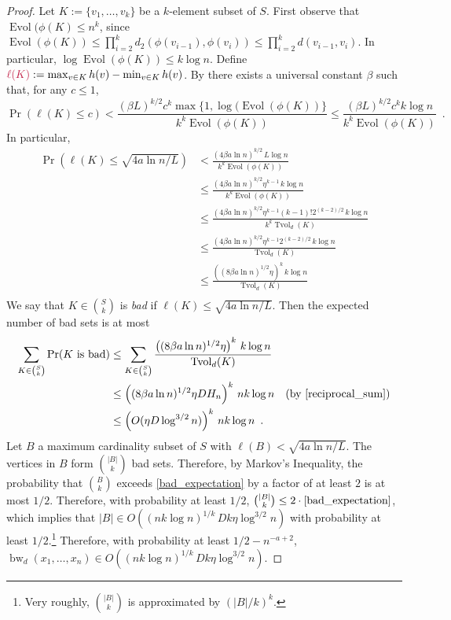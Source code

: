 \documentclass{patmorin}
\makeatletter
\newcommand{\defin}[1]{\emph{\textcolor{brightmaroon}{#1}}}
\def\mathcolor#1#{\@mathcolor{#1}}
\def\@mathcolor#1#2#3{%
  \protect\leavevmode
  \begingroup
    \color#1{#2}#3%
  \endgroup
}
\newcommand{\mathdefin}[1]{\mathcolor{brightmaroon}{#1}}
\DeclareMathOperator{\bw}{bw}
\DeclareMathOperator{\evol}{Evol}
\DeclareMathOperator{\tvol}{Tvol}
\makeatother
\begin{document}
\begin{proof}
  Let  $K:=\{v_1,\ldots,v_k\}$ be a $k$-element subset of $S$. First observe that $\evol(\phi(K)\le n^k$, since $\evol(\phi(K))\le\prod_{i=2}^k d_2(\phi(v_{i-1}),\phi(v_i))\le \prod_{i=2}^k d(v_{i-1},v_i)$.  In particular, $\log\evol(\phi(K))\le k\log n$.  Define $\mathdefin{\ell(K)}:=\max_{v\in K}h(v)-\min_{v\in K} h(v)$.  By \cite[Theorem~9]{feige:approximating} there exists a universal constant $\beta$ such that, for any $c\le 1$,
  \[
      \Pr(\ell(K) \le c)
        < \frac{(\beta L)^{k/2}c^k\max\{1,\log(\evol(\phi(K))\}}{k^k\evol(\phi(K))}
        \le \frac{(\beta L)^{k/2}c^kk\log n}{k^k\evol(\phi(K))} \enspace .
  \]
  In particular,
  \begin{align*}
    \Pr(\ell(K) \le \sqrt{4a\ln n/L})
      & <
      \frac{(4\beta a\ln n)^{k/2}\, L\log n}{k^k\evol(\phi(K))} \\
      & \le \frac{(4\beta a\ln n)^{k/2}\eta^{k-1}\, k\log n}{k^k\evol(\phi(K))} \\
      & \le \frac{(4\beta a\ln n)^{k/2}\eta^{k-1}(k-1)!2^{(k-2)/2}\, k\log n}{k^k\tvol_{d}(K)} \\
      & \le \frac{(4\beta a\ln n)^{k/2}\eta^{k-1}2^{(k-2)/2}\,k\log n}{\tvol_{d}(K)} \\
      & \le \frac{\left((8\beta a\ln n)^{1/2}\eta\right)^{k}\,k\log n}{\tvol_{d}(K)} \\
  \end{align*}
  We say that $K\in\binom{S}{k}$ is \defin{bad} if $\ell(K) \le \sqrt{4a\ln n/L}$. Then the expected number of bad sets is at most
  \begin{align}
    \sum_{K\in \binom{S}{k}} \Pr(\text{$K$ is bad})
    & \le \sum_{K\in \binom{S}{k}} \frac{\left((8\beta a\ln n)^{1/2}\eta\right)^{k}\, k\log n}{\tvol_{d}(K)} \notag \\
    & \le \left((8\beta a\ln n)^{1/2}\eta DH_n\right)^{k}\, nk\log n
    & \text{(by \cref{reciprocal_sum})} \notag \\
    & \le \left(O(\eta D\log^{3/2}n)\right)^{k}\, nk\log n \enspace .
    \label{bad_expectation}
  \end{align}
  Let $B$ a maximum cardinality subset of $S$ with $\ell(B)<\sqrt{4a\ln n/L}$.  The vertices in $B$ form $\binom{|B|}{k}$ bad sets. Therefore, by Markov's Inequality, the probability that $\binom{B}{k}$ exceeds \eqref{bad_expectation} by a factor of at least $2$ is at most $1/2$.  Therefore, with probability at least $1/2$, $\binom{|B|}{k}\le 2\cdot\eqref{bad_expectation}$, which implies that $|B|\in O((nk\log n)^{1/k}\,Dk\eta\log^{3/2} n)$ with probability at least $1/2$.\footnote{Very roughly, $\binom{|B|}{k}$ is approximated by $(|B|/k)^k$.}  Therefore, with probability at least $1/2-n^{-a+2}$, $\bw_d(x_1,\ldots,x_n)\in O((nk\log n)^{1/k}\,Dk\eta\log^{3/2} n)$.
\end{proof}
\end{document}
